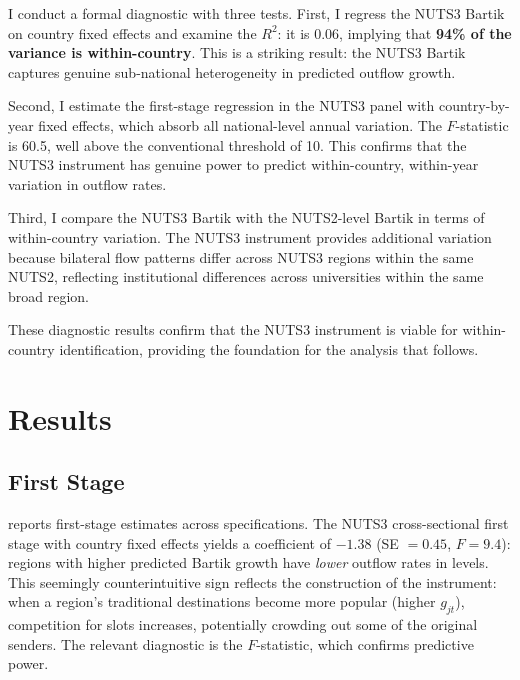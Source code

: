 \documentclass[12pt]{article}
\begin{document}
I conduct a formal diagnostic with three tests. First, I regress the NUTS3 Bartik on country fixed effects and examine the $R^2$: it is 0.06, implying that \textbf{94\% of the variance is within-country}. This is a striking result: the NUTS3 Bartik captures genuine sub-national heterogeneity in predicted outflow growth.

Second, I estimate the first-stage regression in the NUTS3 panel with country-by-year fixed effects, which absorb all national-level annual variation. The $F$-statistic is 60.5, well above the conventional threshold of 10. This confirms that the NUTS3 instrument has genuine power to predict within-country, within-year variation in outflow rates.

Third, I compare the NUTS3 Bartik with the NUTS2-level Bartik in terms of within-country variation. The NUTS3 instrument provides additional variation because bilateral flow patterns differ across NUTS3 regions within the same NUTS2, reflecting institutional differences across universities within the same broad region.

These diagnostic results confirm that the NUTS3 instrument is viable for within-country identification, providing the foundation for the analysis that follows.


\section{Results}
\label{sec:results}

\subsection{First Stage}

 reports first-stage estimates across specifications. The NUTS3 cross-sectional first stage with country fixed effects yields a coefficient of $-1.38$ (SE $= 0.45$, $F = 9.4$): regions with higher predicted Bartik growth have \emph{lower} outflow rates in levels. This seemingly counterintuitive sign reflects the construction of the instrument: when a region's traditional destinations become more popular (higher $g_{jt}$), competition for slots increases, potentially crowding out some of the original senders. The relevant diagnostic is the $F$-statistic, which confirms predictive power.
\end{document}
